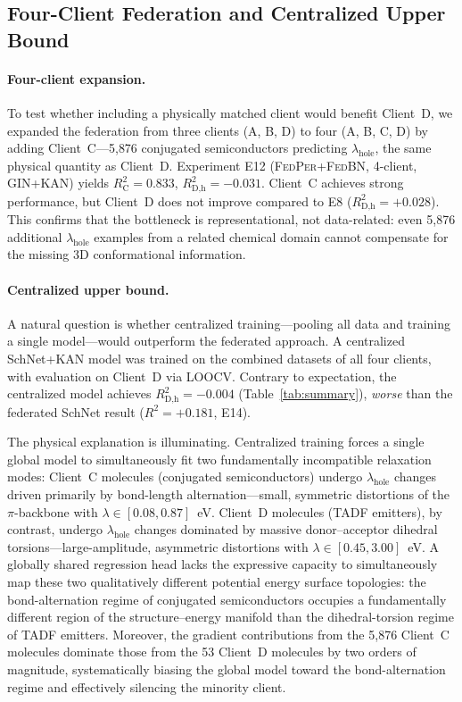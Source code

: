 \documentclass[twocolumn]{article}
\newcommand{\lam}{\lambda}
\newcommand{\lamhole}{\lambda_{\text{hole}}}
\newcommand{\Rsq}{R^{2}}
\newcommand{\FedPer}{\textsc{FedPer}}
\newcommand{\FedBN}{\textsc{FedBN}}
\begin{document}
\subsection{Four-Client Federation and Centralized Upper Bound}\label{sec:four_client}

\paragraph{Four-client expansion.}
To test whether including a physically matched client would benefit Client~D, we expanded the federation from three clients (A, B, D) to four (A, B, C, D) by adding Client~C---5{,}876 conjugated semiconductors predicting $\lamhole$, the same physical quantity as Client~D.
Experiment E12 (\FedPer{}+\FedBN{}, 4-client, GIN+KAN) yields $\Rsq_{\text{C}} = 0.833$, $\Rsq_{\text{D,h}} = -0.031$.
Client~C achieves strong performance, but Client~D does not improve compared to E8 ($\Rsq_{\text{D,h}} = +0.028$).
This confirms that the bottleneck is representational, not data-related: even 5{,}876 additional $\lamhole$ examples from a related chemical domain cannot compensate for the missing 3D conformational information.

\paragraph{Centralized upper bound.}
A natural question is whether centralized training---pooling all data and training a single model---would outperform the federated approach.
A centralized SchNet+KAN model was trained on the combined datasets of all four clients, with evaluation on Client~D via LOOCV.
Contrary to expectation, the centralized model achieves $\Rsq_{\text{D,h}} = -0.004$ (Table~\ref{tab:summary}), \emph{worse} than the federated SchNet result ($\Rsq = +0.181$, E14).

The physical explanation is illuminating.
Centralized training forces a single global model to simultaneously fit two fundamentally incompatible relaxation modes: Client~C molecules (conjugated semiconductors) undergo $\lamhole$ changes driven primarily by bond-length alternation---small, symmetric distortions of the $\pi$-backbone with $\lam \in [0.08, 0.87]$~eV.
Client~D molecules (TADF emitters), by contrast, undergo $\lamhole$ changes dominated by massive donor--acceptor dihedral torsions---large-amplitude, asymmetric distortions with $\lam \in [0.45, 3.00]$~eV.
A globally shared regression head lacks the expressive capacity to simultaneously map these two qualitatively different potential energy surface topologies: the bond-alternation regime of conjugated semiconductors occupies a fundamentally different region of the structure--energy manifold than the dihedral-torsion regime of TADF emitters.
Moreover, the gradient contributions from the 5{,}876 Client~C molecules dominate those from the 53 Client~D molecules by two orders of magnitude, systematically biasing the global model toward the bond-alternation regime and effectively silencing the minority client.
\end{document}
